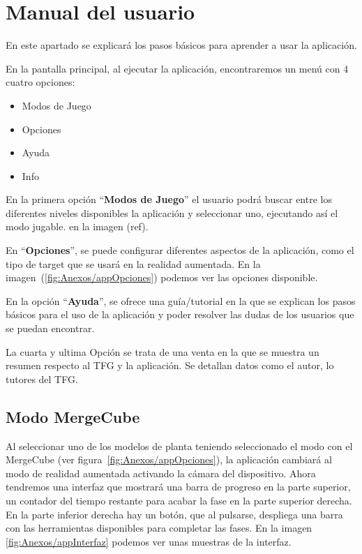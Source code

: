 \section{Manual del usuario}

En este apartado se explicará los pasos básicos para aprender a usar la aplicación.

En la pantalla principal, al ejecutar la aplicación, encontraremos un menú con 4 cuatro opciones: 
\begin{itemize}
	\item Modos de Juego
	\item Opciones
	\item Ayuda
	\item Info
\end{itemize}


En la primera opción ``\textbf{Modos de Juego}'' el usuario podrá buscar entre los diferentes niveles disponibles la aplicación y seleccionar uno, ejecutando así el modo jugable. en la imagen (ref).

En ``\textbf{Opciones}'', se puede configurar diferentes aspectos de la aplicación, como el tipo de target que se usará en la realidad aumentada. En la imagen~(\ref{fig:Anexos/appOpciones}) podemos ver las opciones disponible.


En la opción ``\textbf{Ayuda}'', se ofrece una guía/tutorial en la que se explican los pasos básicos para el uso de la aplicación y poder resolver las dudas de los usuarios que se puedan encontrar.

La cuarta y ultima Opción se trata de una venta en la que se muestra un resumen respecto al TFG y la aplicación. Se detallan datos como el autor, lo tutores del TFG. 


\subsection{Modo MergeCube }

Al seleccionar uno de los modelos de planta teniendo seleccionado el modo con el MergeCube (ver figura~\ref{fig:Anexos/appOpciones}), la aplicación cambiará al modo de realidad aumentada activando la cámara del dispositivo. Ahora tendremos una interfaz que mostrará una barra de progreso en la parte superior, un contador del tiempo restante para acabar la fase en la parte superior derecha. En la parte inferior derecha hay un botón, que al pulsarse, despliega una barra con las herramientas disponibles para completar las fases. En la imagen \ref{fig:Anexos/appInterfaz} podemos ver unas muestras de la interfaz.

